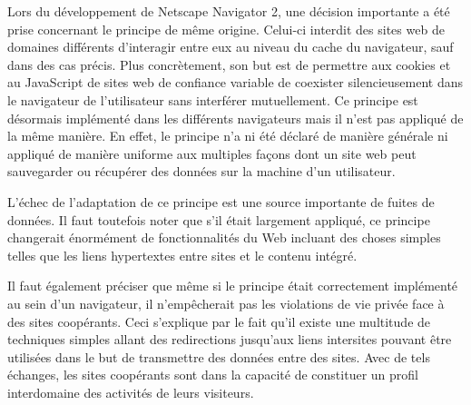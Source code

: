 Lors du développement de Netscape Navigator 2, une décision importante a été prise concernant le principe de même origine. Celui-ci interdit des sites web de domaines différents d'interagir entre eux au niveau du cache du navigateur, sauf dans des cas précis. Plus concrètement, son but est de permettre aux cookies et au JavaScript de sites web de confiance variable de coexister silencieusement dans le navigateur de l'utilisateur sans interférer mutuellement. Ce principe est désormais implémenté dans les différents navigateurs mais il n'est pas appliqué de la même manière. En effet, le principe n'a ni été déclaré de manière générale ni appliqué de manière uniforme aux multiples façons dont un site web peut sauvegarder ou récupérer des données sur la machine d'un utilisateur.
\newline

L'échec de l'adaptation de ce principe est une source importante de fuites de données. Il faut toutefois noter que s'il était largement appliqué, ce principe changerait énormément de fonctionnalités du Web incluant des choses simples telles que les liens hypertextes entre sites et le contenu intégré.
\newline

Il faut également préciser que même si le principe était correctement implémenté au sein d'un navigateur, il n'empêcherait pas les violations de vie privée face à des sites coopérants. Ceci s'explique par le fait qu'il existe une multitude de techniques simples allant des redirections jusqu'aux liens intersites pouvant être utilisées dans le but de transmettre des données entre des sites. Avec de tels échanges, les sites coopérants sont dans la capacité de constituer un profil interdomaine des activités de leurs visiteurs.
\newline
